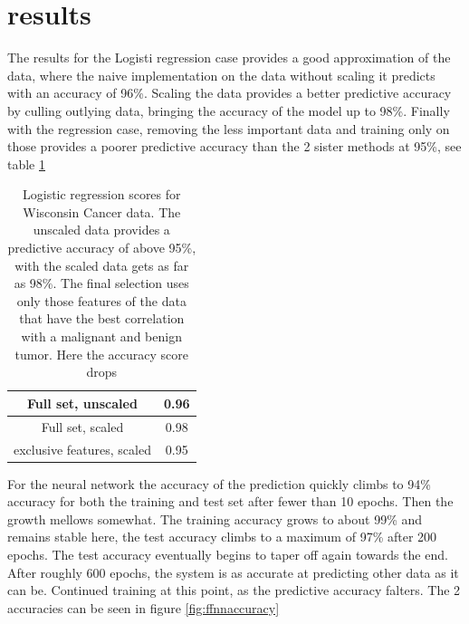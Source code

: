 \documentclass[10pt]{article}
\begin{document}

\section{results}

The results for the Logisti regression case provides a good approximation of
the data, where the naive implementation on the data without scaling it
predicts with an accuracy of 96\%. Scaling the data provides a better
predictive accuracy by culling outlying data, bringing the accuracy of the
model up to 98\%.  Finally with the regression case, removing the less
important data and training only on those provides a poorer predictive accuracy
than the 2 sister methods at 95\%, see table \ref{tab:logreg}

\begin{table}
	\centering
	\begin{tabular}{ |c|c| }
		\hline
		Full set, unscaled & 0.96 \\
		\hline
		Full set, scaled & 0.98 \\
		\hline
		exclusive features, scaled & 0.95 \\
		\hline
	\end{tabular}
	\caption{Logistic regression scores for Wisconsin Cancer data. The unscaled
	data provides a predictive accuracy of above 95\%, with the scaled data
	gets as far as 98\%. The final selection uses only those features of the
	data that have the best correlation with a malignant and benign tumor.
	Here the accuracy score drops }
	\label{tab:logreg}
\end{table}

For the neural network the accuracy of the prediction quickly climbs to 94\% accuracy for both the 
training and test set after fewer than 10 epochs. Then the growth mellows somewhat. The training
accuracy grows to about 99\% and remains stable here, the test accuracy climbs to a maximum of 97\%
after 200 epochs. The test accuracy eventually begins to taper off again towards the end. After roughly
600 epochs, the system is as accurate at predicting other data as it can be. Continued training at this
point, as the predictive accuracy falters. The 2 accuracies can be seen in figure \ref{fig:ffnnaccuracy}
\end{document}
